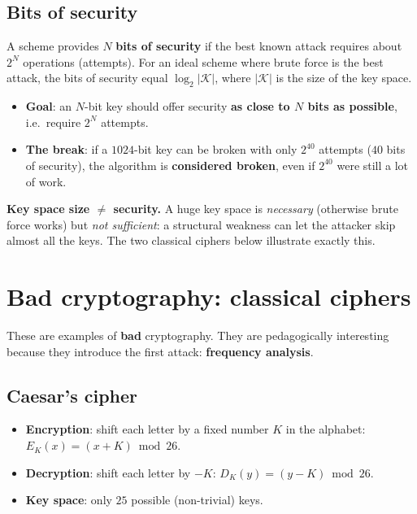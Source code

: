 \subsection{Bits of security}

\begin{definition}
A scheme provides $N$ \textbf{bits of security} if the best known attack requires about $2^N$ operations (attempts). For an ideal scheme where brute force is the best attack, the bits of security equal $\log_2 |\mathcal{K}|$, where $|\mathcal{K}|$ is the size of the key space.
\end{definition}

\begin{itemize}
    \item \textbf{Goal}: an $N$-bit key should offer security \textbf{as close to $N$ bits as possible}, i.e.\ require $2^N$ attempts.
    \item \textbf{The break}: if a $1024$-bit key can be broken with only $2^{40}$ attempts ($40$ bits of security), the algorithm is \textbf{considered broken}, even if $2^{40}$ were still a lot of work.
\end{itemize}

\begin{remark}
\textbf{Key space size $\neq$ security.} A huge key space is \emph{necessary} (otherwise brute force works) but \emph{not sufficient}: a structural weakness can let the attacker skip almost all the keys. The two classical ciphers below illustrate exactly this.
\end{remark}

\section{Bad cryptography: classical ciphers}

These are examples of \textbf{bad} cryptography. They are pedagogically interesting because they introduce the first attack: \textbf{frequency analysis}.

\subsection{Caesar's cipher}

\begin{definition}
\begin{itemize}
    \item \textbf{Encryption}: shift each letter by a fixed number $K$ in the alphabet: $E_K(x) = (x + K) \bmod 26$.
    \item \textbf{Decryption}: shift each letter by $-K$: $D_K(y) = (y - K) \bmod 26$.
    \item \textbf{Key space}: only $25$ possible (non-trivial) keys.
\end{itemize}
\end{definition}

